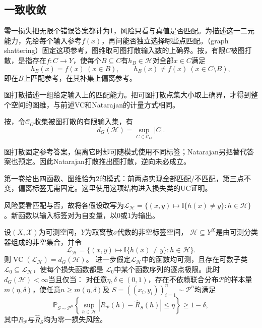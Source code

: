 \subsection{一致收敛}

零一损失把无限个错误答案都计为1，风险只看与真值是否匹配。为描述这一二元能力，先给每个输入参考$f(x)$，再问能否独立选择哪些点匹配。（graph shattering）固定这项参考，图维取可图打散输入数的上确界。按，有限$C$被图打散，是指存在$f:C\to Y$，使每个$B\subseteq C$有$h_B\in\mathcal H$对全部$x\in C$满足
\[
 h_B(x)=f(x)\ (x\in B),\qquad h_B(x)\neq f(x)\ (x\in C\setminus B),
\]
即在$B$上匹配参考，在其补集上偏离参考。

图打散描述一组给定输入上的匹配能力。把可图打散点集大小取上确界，才得到整个空间的图维，与前述VC和Natarajan的计量方式相同。

按，令$\mathcal C_G$收集被图打散的有限输入集，有
\[
 d_G(\mathcal H)=\sup_{C\in\mathcal C_G}|C|.
\]

图打散固定参考答案，偏离它时却可随模式使用不同标签；Natarajan另把替代答案也预定。因此Natarajan打散推出图打散，逆向未必成立。

第一卷给出四函数、图维恰为2的模式：前两点实现全部匹配/不匹配，第三点不变，偏离标签无需固定。这里使用这项结构进入损失类的UC证明。

风险要看匹配与否，故将各假设改写为$\mathcal L_{\mathcal H}=\{(x,y)\mapsto\mathbb I\{h(x)\neq y\}:h\in\mathcal H\}$。新函数以输入标签对为自变量，以0或1为输出。

\begin{theorem}[图维与一致收敛]
\label{thm:graph-uniform-convergence}
设$(X,\mathcal X)$为可测空间，$Y$为取离散$\sigma$代数的非空标签空间，
$\mathcal H\subseteq Y^X$是由可测分类器组成的非空集合，并令
\[
 \mathcal L_{\mathcal H}
 =\{(x,y)\mapsto\mathbb I\{h(x)\neq y\}:h\in\mathcal H\}.
\]
则$\operatorname{VC}(\mathcal L_{\mathcal H})=d_G(\mathcal H)$。
进一步假定$\mathcal L_{\mathcal H}$中的函数均可测，且存在可数子类
$\mathcal L_0\subseteq\mathcal L_{\mathcal H}$，使每个损失函数都是
$\mathcal L_0$中某个函数序列的逐点极限。此时$d_G(\mathcal H)<\infty$当且仅当：
对任意$\eta,\delta\in(0,1)$，存在不依赖联合分布$\mathcal P$的样本量
$m(\eta,\delta)$，使任意$n\geq m(\eta,\delta)$及
$S=((x_i,y_i))_{i=1}^n\sim\mathcal P^n$均满足
\[
 \mathbb P_{S\sim\mathcal P^n}\left\{
 \sup_{h\in\mathcal H}|R_{\mathcal P}(h)-\hat R_S(h)|\leq\eta
 \right\}\geq1-\delta,
\]
其中$R_{\mathcal P}$与$\hat R_S$均为零一损失风险。
\end{theorem}

